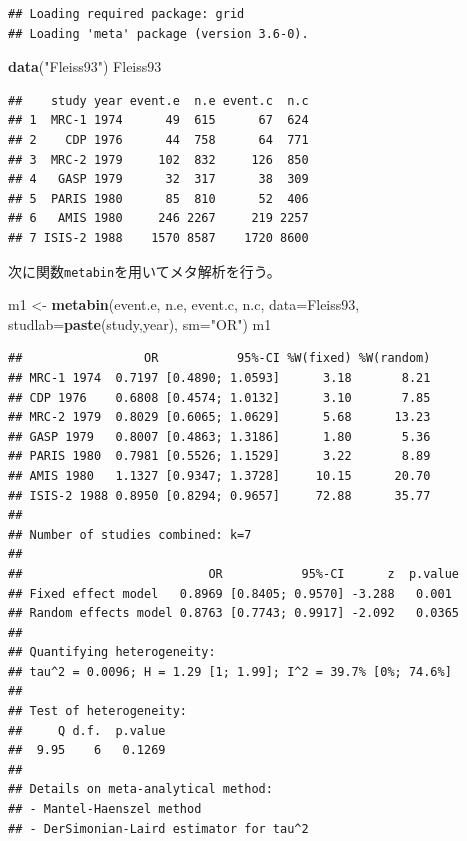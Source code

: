 \documentclass[]{article}
\newenvironment{Shaded}{\begin{snugshade}}{\end{snugshade}}
\newcommand{\KeywordTok}[1]{\textcolor[rgb]{0.13,0.29,0.53}{\textbf{{#1}}}}
\newcommand{\DataTypeTok}[1]{\textcolor[rgb]{0.13,0.29,0.53}{{#1}}}
\newcommand{\StringTok}[1]{\textcolor[rgb]{0.31,0.60,0.02}{{#1}}}
\newcommand{\NormalTok}[1]{{#1}}
\begin{document}
\begin{verbatim}
## Loading required package: grid
## Loading 'meta' package (version 3.6-0).
\end{verbatim}

\begin{Shaded}
\begin{Highlighting}[]
\KeywordTok{data}\NormalTok{(}\StringTok{"Fleiss93"}\NormalTok{)}
\NormalTok{Fleiss93}
\end{Highlighting}
\end{Shaded}

\begin{verbatim}
##    study year event.e  n.e event.c  n.c
## 1  MRC-1 1974      49  615      67  624
## 2    CDP 1976      44  758      64  771
## 3  MRC-2 1979     102  832     126  850
## 4   GASP 1979      32  317      38  309
## 5  PARIS 1980      85  810      52  406
## 6   AMIS 1980     246 2267     219 2257
## 7 ISIS-2 1988    1570 8587    1720 8600
\end{verbatim}

次に関数\texttt{metabin}を用いてメタ解析を行う。

\begin{Shaded}
\begin{Highlighting}[]
\NormalTok{m1 <-}\StringTok{ }\KeywordTok{metabin}\NormalTok{(event.e, n.e, event.c, n.c, }\DataTypeTok{data=}\NormalTok{Fleiss93, }\DataTypeTok{studlab=}\KeywordTok{paste}\NormalTok{(study,year), }\DataTypeTok{sm=}\StringTok{"OR"}\NormalTok{)}
\NormalTok{m1}
\end{Highlighting}
\end{Shaded}

\begin{verbatim}
##                 OR           95%-CI %W(fixed) %W(random)
## MRC-1 1974  0.7197 [0.4890; 1.0593]      3.18       8.21
## CDP 1976    0.6808 [0.4574; 1.0132]      3.10       7.85
## MRC-2 1979  0.8029 [0.6065; 1.0629]      5.68      13.23
## GASP 1979   0.8007 [0.4863; 1.3186]      1.80       5.36
## PARIS 1980  0.7981 [0.5526; 1.1529]      3.22       8.89
## AMIS 1980   1.1327 [0.9347; 1.3728]     10.15      20.70
## ISIS-2 1988 0.8950 [0.8294; 0.9657]     72.88      35.77
## 
## Number of studies combined: k=7
## 
##                          OR           95%-CI      z  p.value
## Fixed effect model   0.8969 [0.8405; 0.9570] -3.288   0.001 
## Random effects model 0.8763 [0.7743; 0.9917] -2.092   0.0365
## 
## Quantifying heterogeneity:
## tau^2 = 0.0096; H = 1.29 [1; 1.99]; I^2 = 39.7% [0%; 74.6%]
## 
## Test of heterogeneity:
##     Q d.f.  p.value
##  9.95    6   0.1269
## 
## Details on meta-analytical method:
## - Mantel-Haenszel method
## - DerSimonian-Laird estimator for tau^2
\end{verbatim}
\end{document}
